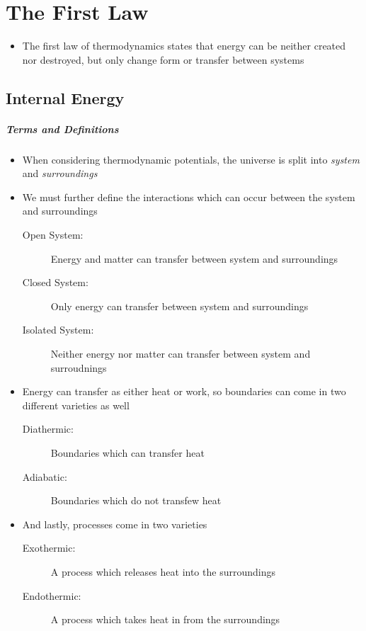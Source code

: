 \documentclass[12pt, openany, letterpaper]{memoir}
\begin{document}
\chapter{The First Law}
\begin{itemize}
	\item The first law of thermodynamics states that energy can be neither created nor destroyed, but only change form or transfer between systems
\end{itemize}
\section{Internal Energy}
\paragraph{Terms and Definitions}
\begin{itemize}
	\item When considering thermodynamic potentials, the universe is split into \emph{system} and \emph{surroundings}
	\item We must further define the interactions which can occur between the system and surroundings
	      \begin{description}
		      \item [Open System:] Energy and matter can transfer between system and surroundings
		      \item [Closed System:] Only energy can transfer between system and surroundings
		      \item [Isolated System:] Neither energy nor matter can transfer between system and surroudnings
	      \end{description}
	\item Energy can transfer as either heat or work, so boundaries can come in two different varieties as well
	      \begin{description}
		      \item [Diathermic:] Boundaries which can transfer heat
		      \item [Adiabatic:] Boundaries which do not transfew heat
	      \end{description}
	\item And lastly, processes come in two varieties
	      \begin{description}
		      \item[Exothermic:] A process which releases heat into the surroundings
		      \item[Endothermic:] A process which takes heat in from the surroundings
	      \end{description}
\end{itemize}
\end{document}
